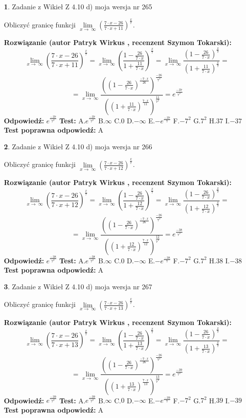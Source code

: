\documentclass[12pt, a4paper]{article}
\theoremstyle{definition} %
\newtheorem{zad}{}
\newcommand{\zadStart}[1]{\begin{zad}#1\newline}
\newcommand{\zadStop}{\end{zad}}
\newcommand{\rozwStart}[2]{\noindent \textbf{Rozwiązanie (autor #1 , recenzent #2): }\newline}
\newcommand{\rozwStop}{\newline}
\newcommand{\odpStart}{\noindent \textbf{Odpowiedź:}\newline}
\newcommand{\odpStop}{\newline}
\newcommand{\testStart}{\noindent \textbf{Test:}\newline}
\newcommand{\testStop}{\newline}
\newcommand{\kluczStart}{\noindent \textbf{Test poprawna odpowiedź:}\newline}
\newcommand{\kluczStop}{\newline}
\begin{document}
\zadStart{Zadanie z Wikieł Z 4.10 d) moja wersja nr 265}


Obliczyć granicę funkcji  $\lim\limits_{x\to\ \infty}(\frac{7\cdot x-26}{7\cdot x+11})^{\frac{x}{7}}$.
\zadStop
\rozwStart{Patryk Wirkus}{Szymon Tokarski}
$$\lim\limits_{x\to\ \infty}(\frac{7\cdot x-26}{7\cdot x+11})^{\frac{x}{7}} = \lim\limits_{x\to\ \infty}(\frac{1-\frac{26}{7\cdot x}}{1+\frac{11}{7\cdot x}})^{\frac{x}{7}}=\lim\limits_{x\to\ \infty}\frac{(1-\frac{26}{7\cdot x})^{\frac{x}{7}}}{(1+\frac{11}{7\cdot x})^{\frac{x}{7}}}=$$
$$=\lim\limits_{x\to\ \infty}\frac{((1-\frac{26}{7\cdot x})^{\frac{-7\cdot x}{26}})^{\frac{-26}{7^{2}}}}{((1+\frac{11}{7\cdot x})^{\frac{7\cdot x}{11}})^{\frac{11}{7^{2}}}}=e^{\frac{-37}{7^{2}}}$$
\rozwStop
\odpStart
$e^{\frac{-37}{7^{2}}}$
\odpStop
\testStart
A.$e^{\frac{-37}{7^{2}}}$ B.$\infty$ C.$0$ D.$-\infty$ E.$-e^{\frac{-37}{7}}$
F.$-7^{2}$ G.$7^{2}$
H.$37$
I.$-37$
\testStop
\kluczStart
A
\kluczStop



\zadStart{Zadanie z Wikieł Z 4.10 d) moja wersja nr 266}


Obliczyć granicę funkcji  $\lim\limits_{x\to\ \infty}(\frac{7\cdot x-26}{7\cdot x+12})^{\frac{x}{7}}$.
\zadStop
\rozwStart{Patryk Wirkus}{Szymon Tokarski}
$$\lim\limits_{x\to\ \infty}(\frac{7\cdot x-26}{7\cdot x+12})^{\frac{x}{7}} = \lim\limits_{x\to\ \infty}(\frac{1-\frac{26}{7\cdot x}}{1+\frac{12}{7\cdot x}})^{\frac{x}{7}}=\lim\limits_{x\to\ \infty}\frac{(1-\frac{26}{7\cdot x})^{\frac{x}{7}}}{(1+\frac{12}{7\cdot x})^{\frac{x}{7}}}=$$
$$=\lim\limits_{x\to\ \infty}\frac{((1-\frac{26}{7\cdot x})^{\frac{-7\cdot x}{26}})^{\frac{-26}{7^{2}}}}{((1+\frac{12}{7\cdot x})^{\frac{7\cdot x}{12}})^{\frac{12}{7^{2}}}}=e^{\frac{-38}{7^{2}}}$$
\rozwStop
\odpStart
$e^{\frac{-38}{7^{2}}}$
\odpStop
\testStart
A.$e^{\frac{-38}{7^{2}}}$ B.$\infty$ C.$0$ D.$-\infty$ E.$-e^{\frac{-38}{7}}$
F.$-7^{2}$ G.$7^{2}$
H.$38$
I.$-38$
\testStop
\kluczStart
A
\kluczStop



\zadStart{Zadanie z Wikieł Z 4.10 d) moja wersja nr 267}


Obliczyć granicę funkcji  $\lim\limits_{x\to\ \infty}(\frac{7\cdot x-26}{7\cdot x+13})^{\frac{x}{7}}$.
\zadStop
\rozwStart{Patryk Wirkus}{Szymon Tokarski}
$$\lim\limits_{x\to\ \infty}(\frac{7\cdot x-26}{7\cdot x+13})^{\frac{x}{7}} = \lim\limits_{x\to\ \infty}(\frac{1-\frac{26}{7\cdot x}}{1+\frac{13}{7\cdot x}})^{\frac{x}{7}}=\lim\limits_{x\to\ \infty}\frac{(1-\frac{26}{7\cdot x})^{\frac{x}{7}}}{(1+\frac{13}{7\cdot x})^{\frac{x}{7}}}=$$
$$=\lim\limits_{x\to\ \infty}\frac{((1-\frac{26}{7\cdot x})^{\frac{-7\cdot x}{26}})^{\frac{-26}{7^{2}}}}{((1+\frac{13}{7\cdot x})^{\frac{7\cdot x}{13}})^{\frac{13}{7^{2}}}}=e^{\frac{-39}{7^{2}}}$$
\rozwStop
\odpStart
$e^{\frac{-39}{7^{2}}}$
\odpStop
\testStart
A.$e^{\frac{-39}{7^{2}}}$ B.$\infty$ C.$0$ D.$-\infty$ E.$-e^{\frac{-39}{7}}$
F.$-7^{2}$ G.$7^{2}$
H.$39$
I.$-39$
\testStop
\kluczStart
A
\kluczStop
\end{document}
